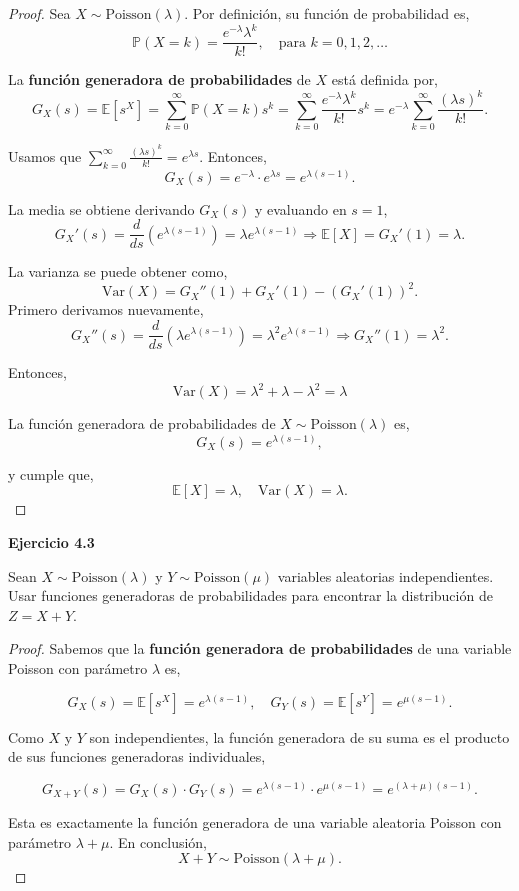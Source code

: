 \documentclass{article}
\begin{document}
\begin{proof}
Sea $X \sim \text{Poisson}(\lambda)$. Por definición, su función de probabilidad es,
\[
\mathbb{P}(X = k) = \frac{e^{-\lambda} \lambda^k}{k!}, \quad \text{para } k = 0, 1, 2, \dots
\]

La \textbf{función generadora de probabilidades} de $X$ está definida por,
\[
G_X(s) = \mathbb{E}[s^X] = \sum_{k=0}^{\infty} \mathbb{P}(X = k) s^k
= \sum_{k=0}^{\infty} \frac{e^{-\lambda} \lambda^k}{k!} s^k 
= e^{-\lambda} \sum_{k=0}^{\infty} \frac{(\lambda s)^k}{k!}.
\]

Usamos que $\sum_{k=0}^{\infty} \frac{(\lambda s)^k}{k!} = e^{\lambda s}$. Entonces,
\[
G_X(s) = e^{-\lambda} \cdot e^{\lambda s} = e^{\lambda(s - 1)}.
\]

La media se obtiene derivando $G_X(s)$ y evaluando en $s = 1$,
\[
G_X'(s) = \frac{d}{ds} \left( e^{\lambda(s - 1)} \right) = \lambda e^{\lambda(s - 1)}
\Rightarrow \mathbb{E}[X] = G_X'(1) = \lambda.
\]

La varianza se puede obtener como,
\[
\text{Var}(X) = G_X''(1) + G_X'(1) - (G_X'(1))^2.
\]
Primero derivamos nuevamente,
\[
G_X''(s) = \frac{d}{ds}(\lambda e^{\lambda(s - 1)}) = \lambda^2 e^{\lambda(s - 1)}
\Rightarrow G_X''(1) = \lambda^2.
\]

Entonces,
\[
\text{Var}(X) = \lambda^2 + \lambda - \lambda^2 = \lambda
\]

La función generadora de probabilidades de $X \sim \text{Poisson}(\lambda)$ es,
\[
G_X(s) = e^{\lambda(s - 1)},
\]

y cumple que,
\[
\mathbb{E}[X] = \lambda, \quad \text{Var}(X) = \lambda.
\]
\end{proof}


\textbf{Ejercicio 4.3}

Sean $X \sim \text{Poisson}(\lambda)$ y $Y \sim \text{Poisson}(\mu)$ variables aleatorias independientes. Usar funciones generadoras de probabilidades para encontrar la distribución de $Z = X + Y$.

\begin{proof}
Sabemos que la \textbf{función generadora de probabilidades} de una variable Poisson con parámetro $\lambda$ es,

\[
G_X(s) = \mathbb{E}[s^X] = e^{\lambda(s - 1)}, \quad
G_Y(s) = \mathbb{E}[s^Y] = e^{\mu(s - 1)}.
\]

Como $X$ y $Y$ son independientes, la función generadora de su suma es el producto de sus funciones generadoras individuales,

\[
G_{X+Y}(s) = G_X(s) \cdot G_Y(s) = e^{\lambda(s - 1)} \cdot e^{\mu(s - 1)} = e^{(\lambda + \mu)(s - 1)}.
\]

Esta es exactamente la función generadora de una variable aleatoria Poisson con parámetro $\lambda + \mu$.
En conclusión,
\[
X + Y \sim \text{Poisson}(\lambda + \mu).
\]

\end{proof}
\end{document}
